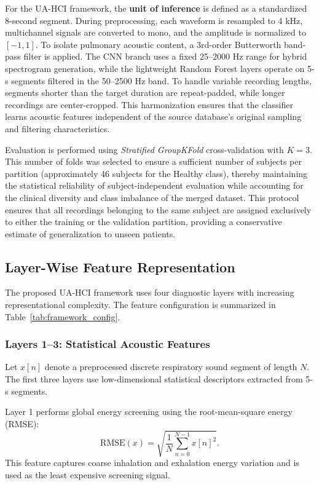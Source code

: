

For the UA-HCI framework, the \textbf{unit of inference} is defined as a standardized 8-second segment. During preprocessing, each waveform is resampled to 4 kHz, multichannel signals are converted to mono, and the amplitude is normalized to $[-1, 1]$. To isolate pulmonary acoustic content, a 3rd-order Butterworth band-pass filter is applied. The CNN branch uses a fixed 25--2000 Hz range for hybrid spectrogram generation, while the lightweight Random Forest layers operate on 5-s segments filtered in the 50--2500 Hz band. To handle variable recording lengths, segments shorter than the target duration are repeat-padded, while longer recordings are center-cropped. This harmonization ensures that the classifier learns acoustic features independent of the source database's original sampling and filtering characteristics.

Evaluation is performed using \textit{Stratified GroupKFold} cross-validation with $K=3$. This number of folds was selected to ensure a sufficient number of subjects per partition (approximately 46 subjects for the Healthy class), thereby maintaining the statistical reliability of subject-independent evaluation while accounting for the clinical diversity and class imbalance of the merged dataset. This protocol ensures that all recordings belonging to the same subject are assigned exclusively to either the training or the validation partition, providing a conservative estimate of generalization to unseen patients.

\subsection{Layer-Wise Feature Representation}
The proposed UA-HCI framework uses four diagnostic layers with increasing representational complexity. The feature configuration is summarized in Table~\ref{tab:framework_config}.



\subsubsection{Layers 1--3: Statistical Acoustic Features}
Let $x[n]$ denote a preprocessed discrete respiratory sound segment of length $N$. The first three layers use low-dimensional statistical descriptors extracted from 5-s segments.

Layer 1 performs global energy screening using the root-mean-square energy (RMSE):
\begin{equation}
\mathrm{RMSE}(x)=\sqrt{\frac{1}{N}\sum_{n=0}^{N-1}x[n]^2}.
\end{equation}
This feature captures coarse inhalation and exhalation energy variation and is used as the least expensive screening signal.

